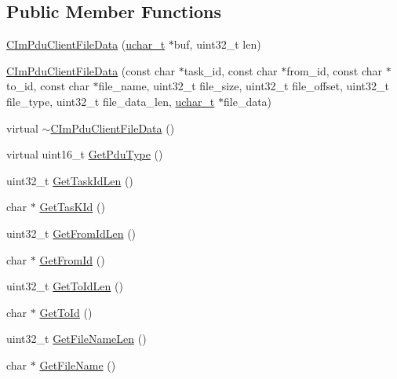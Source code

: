 \subsection*{Public Member Functions}
\begin{DoxyCompactItemize}
\item 
\hyperlink{class_c_im_pdu_client_file_data_a72d6723dc0b98329a5b1160564362237}{C\+Im\+Pdu\+Client\+File\+Data} (\hyperlink{base_2ostype_8h_a124ea0f8f4a23a0a286b5582137f0b8d}{uchar\+\_\+t} $\ast$buf, uint32\+\_\+t len)
\item 
\hyperlink{class_c_im_pdu_client_file_data_af4b3cd55f412f0e668be0b1bf6ef1167}{C\+Im\+Pdu\+Client\+File\+Data} (const char $\ast$task\+\_\+id, const char $\ast$from\+\_\+id, const char $\ast$to\+\_\+id, const char $\ast$file\+\_\+name, uint32\+\_\+t file\+\_\+size, uint32\+\_\+t file\+\_\+offset, uint32\+\_\+t file\+\_\+type, uint32\+\_\+t file\+\_\+data\+\_\+len, \hyperlink{base_2ostype_8h_a124ea0f8f4a23a0a286b5582137f0b8d}{uchar\+\_\+t} $\ast$file\+\_\+data)
\item 
virtual \hyperlink{class_c_im_pdu_client_file_data_ac8c77867774fc292175e8180d8b60d43}{$\sim$\+C\+Im\+Pdu\+Client\+File\+Data} ()
\item 
virtual uint16\+\_\+t \hyperlink{class_c_im_pdu_client_file_data_acff99607c4bda05fc83a54b7a03ad149}{Get\+Pdu\+Type} ()
\item 
uint32\+\_\+t \hyperlink{class_c_im_pdu_client_file_data_a034d84eadb33ae2388e2dc450a74bd83}{Get\+Task\+Id\+Len} ()
\item 
char $\ast$ \hyperlink{class_c_im_pdu_client_file_data_ad9764e0f8774d21f050bfe5c185129a1}{Get\+Tas\+K\+Id} ()
\item 
uint32\+\_\+t \hyperlink{class_c_im_pdu_client_file_data_aea5368d34549b90236330e9bc18111e2}{Get\+From\+Id\+Len} ()
\item 
char $\ast$ \hyperlink{class_c_im_pdu_client_file_data_a23966ff7b49d53a9b783df1636d8b4ad}{Get\+From\+Id} ()
\item 
uint32\+\_\+t \hyperlink{class_c_im_pdu_client_file_data_ad3d937e2c9a8a5df4cac23248a7c5558}{Get\+To\+Id\+Len} ()
\item 
char $\ast$ \hyperlink{class_c_im_pdu_client_file_data_a47d4c3bec268c5777956f5dbc2fba216}{Get\+To\+Id} ()
\item 
uint32\+\_\+t \hyperlink{class_c_im_pdu_client_file_data_a97687638ae3104e97f0803f13f6dfbc9}{Get\+File\+Name\+Len} ()
\item 
char $\ast$ \hyperlink{class_c_im_pdu_client_file_data_a1708d68a14cc7f9ebe000c5c14093be7}{Get\+File\+Name} ()

\end{DoxyCompactItemize}
